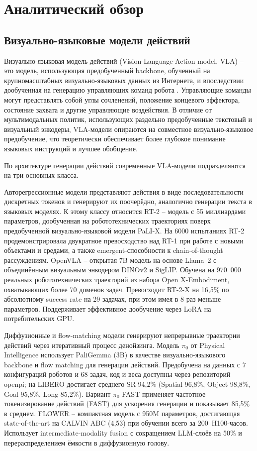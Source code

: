 \chapter{Аналитический обзор}
\label{ch:chap1}

\section{Визуально-языковые модели действий}
\label{sec:vla}

    Визуально-языковая модель действий (Vision-Language-Action model, VLA) -- это модель, использующая предобученный backbone, обученный на крупномасштабных визуально-языковых данных из Интернета, и впоследствии дообученная на генерацию управляющих команд робота \cite{reuss2025blog}. Управляющие команды могут представлять собой углы сочленений, положение концевого эффектора, состояние захвата и другие управляющие воздействия. В отличие от мультимодальных политик, использующих раздельно предобученные текстовый и визуальный энкодеры, VLA-модели опираются на совместное визуально-языковое предобучение, что теоретически обеспечивает более глубокое понимание языковых инструкций и лучшее обобщение.

    По архитектуре генерации действий современные VLA-модели подразделяются на три основных класса.

    Авторегрессионные модели представляют действия в виде последовательности дискретных токенов и генерируют их поочерёдно, аналогично генерации текста в языковых моделях. К этому классу относится RT-2 \cite{brohan2023rt2} -- модель с 55 миллиардами параметров, дообученная на робототехнических траекториях поверх предобученной визуально-языковой модели PaLI-X. На 6000 испытаниях RT-2 продемонстрировала двукратное превосходство над RT-1 при работе с новыми объектами и средами, а также emergent-способности к chain-of-thought рассуждениям. OpenVLA \cite{kim2024openvla} -- открытая 7B модель на основе Llama~2 с объединённым визуальным энкодером DINOv2 и SigLIP. Обучена на 970~000 реальных робототехнических траекторий из набора Open X-Embodiment, охватывающих более 70 доменов задач. Превосходит RT-2-X на 16,5\% по абсолютному success rate на 29 задачах, при этом имея в 8 раз меньше параметров. Поддерживает эффективное дообучение через LoRA на потребительских GPU.

    Диффузионные и flow-matching модели генерируют непрерывные траектории действий через итеративный процесс денойзинга. Модель $\pi_0$ \cite{black2024pi0} от Physical Intelligence использует PaliGemma (3B) в качестве визуально-языкового backbone и flow matching для генерации действий. Предобучена на данных с 7 конфигураций роботов и 68 задач, код и веса доступны через репозиторий openpi; на LIBERO достигает среднего SR 94,2\% (Spatial 96,8\%, Object 98,8\%, Goal 95,8\%, Long 85,2\%). Вариант $\pi_0$-FAST \cite{black2024pi0} применяет частотное токенизирование действий (FAST) для ускорения генерации и показывает 85,5\% в среднем. FLOWER \cite{reuss2025flower} -- компактная модель с 950M параметров, достигающая state-of-the-art на CALVIN ABC (4,53) при обучении всего за 200~H100-часов. Использует intermediate-modality fusion с сокращением LLM-слоёв на 50\% и перераспределением ёмкости в диффузионную голову.

